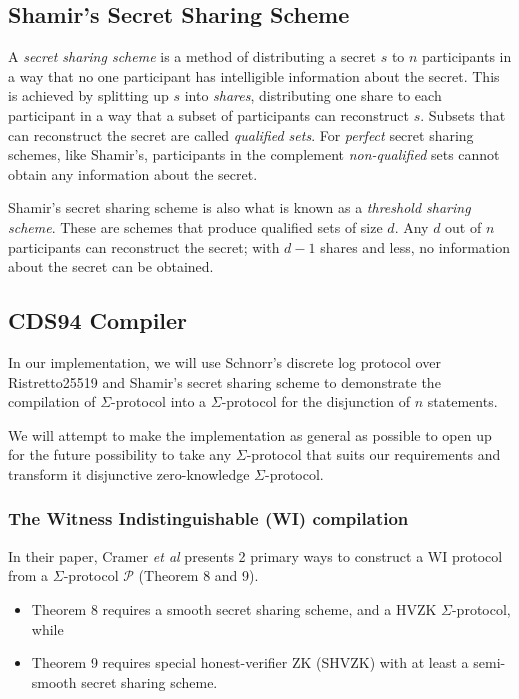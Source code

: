 \subsection{Shamir's Secret Sharing Scheme}
A \textit{secret sharing scheme} is a method of distributing a secret $s$ to $n$ participants in a way that no one participant has intelligible information about the secret. This is achieved by splitting up $s$ into \textit{shares}, distributing one share to each participant in a way that a subset of participants can reconstruct $s$. Subsets that can reconstruct the secret are called \textit{qualified sets}. For \textit{perfect} secret sharing schemes, like Shamir's, participants in the complement \textit{non-qualified} sets cannot obtain any information about the secret.

Shamir's secret sharing scheme \cite{DBLP:journals/cacm/Shamir79} is also what is known as a \textit{threshold sharing scheme}. These are schemes that produce  qualified sets of size $d$. Any $d$ out of $n$ participants can reconstruct the secret; with $d-1$ shares and less, no  information about the secret can be obtained. 

\subsection{CDS94 Compiler}


In our implementation, we will use Schnorr's discrete log protocol over Ristretto25519 and Shamir's secret sharing scheme to demonstrate the compilation of $\Sigma$-protocol into a $\Sigma$-protocol for the disjunction of $n$ statements. 

We will attempt to make the implementation as general as possible to open up for the future possibility to take any $\Sigma$-protocol that suits our requirements and transform it disjunctive zero-knowledge $\Sigma$-protocol.

\subsubsection{The Witness Indistinguishable (WI) compilation}

In their paper, Cramer {\em{et al}} \cite{CDS94} presents 2 primary ways to construct a WI protocol from a $\Sigma$-protocol $\mathcal P$ (Theorem 8 and 9). 

\begin{itemize}
    \item Theorem 8 requires a smooth secret sharing scheme, and a HVZK $\Sigma$-protocol, while
    \item Theorem 9 requires special honest-verifier ZK (SHVZK) with at least a semi-smooth secret sharing scheme.
\end{itemize}

